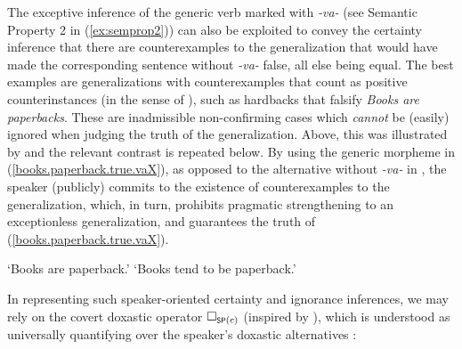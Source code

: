 \documentclass[output=paper,colorlinks,citecolor=brown]{langscibook}
\begin{document}
The exceptive inference of the generic verb marked with \textit{-va-} (see Semantic Property 2 in (\ref{ex:semprop2})) can also be exploited to
convey the certainty inference that there are counterexamples to the generalization that would have made
the corresponding sentence without \textit{-va-} false, all else being equal.
The best examples are generalizations with counterexamples
that count as positive counterinstances
(in the sense of \citealt{leslie2008}), such as hardbacks
that falsify \textit{Books are paperbacks}.  These are inadmissible
non-confirming cases which \textit{cannot} be (easily) ignored when judging
the truth of the generalization.
Above, this was illustrated by  and the relevant contrast is repeated below. By using the generic morpheme in (\ref{books.paperback.true.vaX}), as opposed to the alternative without \textit{-va-} in , the speaker (publicly) commits to the existence of
counterexamples to the generalization, which, in turn, prohibits pragmatic strengthening to an exceptionless generalization,
and guarantees the truth of (\ref{books.paperback.true.vaX}).

\ea\label{books.paperbackX.toplevel}
  
\glt `Books are paperback.'
 
\glt `Books tend to be paperback.'
\z
\z



\noindent In representing such speaker-oriented certainty and ignorance inferences,
we may rely on the covert doxastic operator $\Box_{\cnst{sp}(c)}$
(inspired by \citealt{Meyer2013}),
which is understood as universally quantifying over the speaker’s
doxastic alternatives \citep{Deganoetal2025}:
\end{document}

